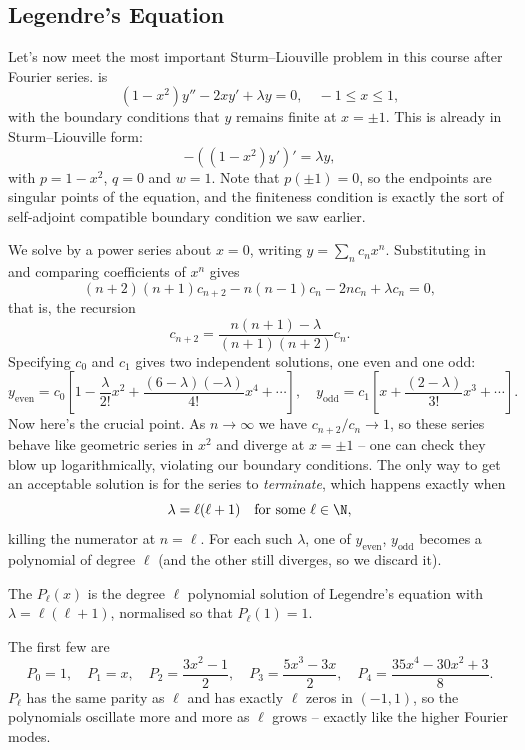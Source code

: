 \subsection{Legendre's Equation}

Let's now meet the most important Sturm--Liouville problem in this course after Fourier series.  is
$$
(1 - x^2) y'' - 2x y' + \lambda y = 0, \quad -1 \leq x \leq 1,
$$
with the boundary conditions that $y$ remains finite at $x = \pm 1$.
This is already in Sturm--Liouville form:
$$
-\left((1 - x^2) y'\right)' = \lambda y,
$$
with $p = 1 - x^2$, $q = 0$ and $w = 1$. Note that $p(\pm 1) = 0$, so the endpoints are singular points of the equation, and the finiteness condition is exactly the sort of self-adjoint compatible boundary condition we saw earlier.

We solve by a power series about $x = 0$, writing $y = \sum_n c_n x^n$. Substituting in and comparing coefficients of $x^n$ gives
$$
(n+2)(n+1) c_{n + 2} - n(n-1) c_n - 2n c_n + \lambda c_n = 0,
$$
that is, the recursion
$$
c_{n + 2} = \frac{n(n + 1) - \lambda}{(n + 1)(n + 2)} c_n.
$$
Specifying $c_0$ and $c_1$ gives two independent solutions, one even and one odd:
$$
y_{\text{even}} = c_0 \left[1 - \frac{\lambda}{2!} x^2 + \frac{(6 - \lambda)(-\lambda)}{4!}x^4 + \cdots \right], \quad
y_{\text{odd}} = c_1 \left[x + \frac{(2 - \lambda)}{3!}x^3 + \cdots\right].
$$
Now here's the crucial point. As $n \rightarrow \infty$ we have $c_{n+2}/c_n \rightarrow 1$, so these series behave like geometric series in $x^2$ and diverge at $x = \pm 1$ -- one can check they blow up logarithmically, violating our boundary conditions. The only way to get an acceptable solution is for the series to \emph{terminate}, which happens exactly when
$$
\lambda = \ell (\ell + 1) \quad \text{for some } \ell \in \N,
$$
killing the numerator at $n = \ell$. For each such $\lambda$, one of $y_{\text{even}}$, $y_{\text{odd}}$ becomes a polynomial of degree $\ell$ (and the other still diverges, so we discard it).

\begin{definition}
    The  $P_\ell(x)$ is the degree $\ell$ polynomial solution of Legendre's equation with $\lambda = \ell(\ell + 1)$, normalised so that $P_\ell(1) = 1$.
\end{definition}

The first few are
$$
P_0 = 1, \quad P_1 = x, \quad P_2 = \frac{3x^2 - 1}{2}, \quad P_3 = \frac{5x^3 - 3x}{2}, \quad P_4 = \frac{35 x^4 - 30 x^2 + 3}{8}.
$$
$P_\ell$ has the same parity as $\ell$ and has exactly $\ell$ zeros in $(-1, 1)$, so the polynomials oscillate more and more as $\ell$ grows -- exactly like the higher Fourier modes.

